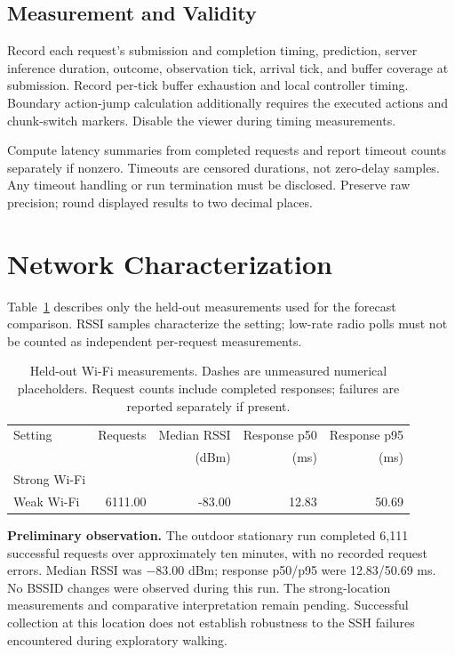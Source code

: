 \documentclass[11pt]{article}
\newcommand{\numplaceholder}{\textemdash}
\begin{document}
\subsection{Measurement and Validity}
Record each request's submission and completion timing, prediction, server inference duration, outcome, observation tick, arrival tick, and buffer coverage at submission. Record per-tick buffer exhaustion and local controller timing. Boundary action-jump calculation additionally requires the executed actions and chunk-switch markers. Disable the viewer during timing measurements.

Compute latency summaries from completed requests and report timeout counts separately if nonzero. Timeouts are censored durations, not zero-delay samples. Any timeout handling or run termination must be disclosed. Preserve raw precision; round displayed results to two decimal places.

\section{Network Characterization}
Table~\ref{tab:environment} describes only the held-out measurements used for the forecast comparison. RSSI samples characterize the setting; low-rate radio polls must not be counted as independent per-request measurements.

\begin{table}[htbp]
\centering
\caption{Held-out Wi-Fi measurements. Dashes are unmeasured numerical placeholders. Request counts include completed responses; failures are reported separately if present.}
\label{tab:environment}
\small
\begin{tabularx}{\linewidth}{Xrrrr}
\toprule
Setting & Requests & Median RSSI & Response p50 & Response p95\\
 & & (dBm) & (ms) & (ms)\\
\midrule
Strong Wi-Fi & \numplaceholder & \numplaceholder & \numplaceholder & \numplaceholder\\
Weak Wi-Fi & 6111.00 & -83.00 & 12.83 & 50.69\\
\bottomrule
\end{tabularx}
\end{table}
\textbf{Preliminary observation.} The outdoor stationary run completed 6,111 successful requests over approximately ten minutes, with no recorded request errors. Median RSSI was $-83.00$ dBm; response p50/p95 were 12.83/50.69 ms. No BSSID changes were observed during this run. The strong-location measurements and comparative interpretation remain pending. Successful collection at this location does not establish robustness to the SSH failures encountered during exploratory walking.
\end{document}
